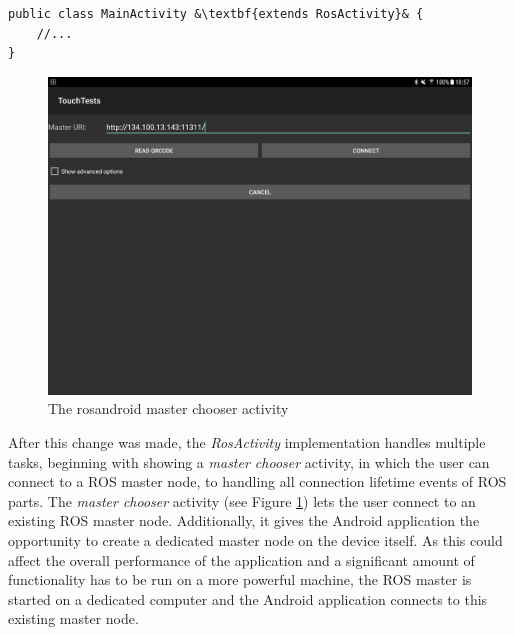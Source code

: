\begin{lstlisting}[caption={Changes to MainActivity}, escapechar=&]
public class MainActivity &\textbf{extends RosActivity}& {
	//...
}
\end{lstlisting}

\begin{figure}
\caption{\label{fig:impl:masterchooser}The rosandroid master chooser activity}
\includegraphics[width=\linewidth]{assets/chpt_impl/masterchooser}	
\end{figure}

After this change was made, the \textit{RosActivity} implementation handles multiple tasks, beginning with showing a \textit{master chooser}  activity, in which the user can connect to a ROS master node, to handling all connection lifetime events of ROS parts. The \textit{master chooser} activity (see Figure \ref{fig:impl:masterchooser}) lets the user connect to an existing ROS master node. Additionally, it gives the Android application the opportunity to create a dedicated master node on the device itself. As this could affect the overall performance of the application and a significant amount of functionality has to be run on a more powerful machine, the ROS master is started on a dedicated computer and the Android application connects to this existing master node.

